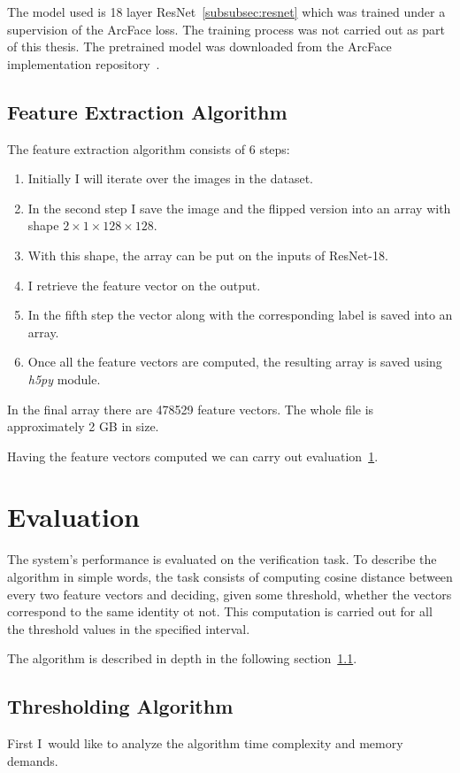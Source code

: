 The model used is 18 layer ResNet~\ref{subsubsec:resnet} which was trained under a supervision of the ArcFace loss.
The training process was not carried out as part of this thesis.
The pretrained model was downloaded from the ArcFace implementation repository~\cite{ArcFacePyTorch}.

\subsection{Feature Extraction Algorithm}\label{subsec:feexalgo}
The feature extraction algorithm consists of 6 steps:
\begin{enumerate}
    \item Initially I will iterate over the images in the dataset.
    \item In the second step I save the image and the flipped version into an array
    with shape $2\times1\times128\times128$.
    \item With this shape, the array can be put on the inputs of ResNet-18.
    \item I retrieve the feature vector on the output.
    \item In the fifth step the vector along with the corresponding label is saved into an array.
    \item Once all the feature vectors are computed, the resulting array is saved using \textit{h5py} module.
\end{enumerate}

In the final array there are 478529 feature vectors.
The whole file is approximately 2 GB in size.

Having the feature vectors computed we can carry out evaluation~\ref{sec:evaluation}.

\section{Evaluation}\label{sec:evaluation}
The system's performance is evaluated on the verification task.
To describe the algorithm in simple words, the task consists of computing cosine distance between every two feature
vectors and deciding, given some threshold, whether the vectors correspond to the same identity ot not.
This computation is carried out for all the threshold values in the specified interval.

The algorithm is described in depth in the following section~\ref{subsec:thresholding-algorithm}.

\subsection{Thresholding Algorithm}\label{subsec:thresholding-algorithm}
First I would like to analyze the algorithm time complexity and memory demands.

